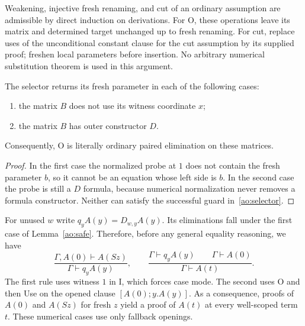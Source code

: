 Weakening, injective fresh renaming, and cut of an ordinary assumption are
admissible by direct induction on derivations.  For O, these operations
leave its matrix and determined target unchanged up to fresh renaming.
For cut, replace uses of the unconditional constant clause for the cut
assumption by its supplied proof; freshen local parameters before insertion.
No arbitrary numerical substitution theorem is used in this argument.

\begin{lemma}
\label{ao:safe}
The selector returns its fresh parameter in each of the following cases:
\begin{enumerate}
\item the matrix $B$ does not use its witness coordinate $x$;
\item the matrix $B$ has outer constructor $D$.
\end{enumerate}
Consequently, O is literally ordinary paired elimination on these matrices.
\end{lemma}
\begin{proof}
In the first case the normalized probe at $1$ does not contain the fresh
parameter $b$, so it cannot be an equation whose left side is $b$.
In the second case the probe is still a $D$ formula, because numerical
normalization never removes a formula constructor.  Neither can satisfy
the successful guard in~\eqref{ao:selector}.
\end{proof}

For unused $w$ write $q_yA(y)=D_{w,y}A(y)$.  Its eliminations fall under
the first case of Lemma~\ref{ao:safe}.  Therefore, before any general
equality reasoning, we have
\[
 \frac{\Gamma,A(0)\vdash A(Sz)}{\Gamma\vdash q_yA(y)},
 \qquad
 \frac{\Gamma\vdash q_yA(y)\qquad\Gamma\vdash A(0)}
      {\Gamma\vdash A(t)}.
 \tag{Q}\label{ao:q}
\]
The first rule uses witness $1$ in I, which forces case mode.  The second
uses O and then Use on the opened clause $[A(0);y.A(y)]$.  As a consequence,
proofs of $A(0)$ and $A(Sz)$ for fresh $z$ yield a proof of $A(t)$ at every
well-scoped term $t$.  These numerical cases use only fallback openings.

